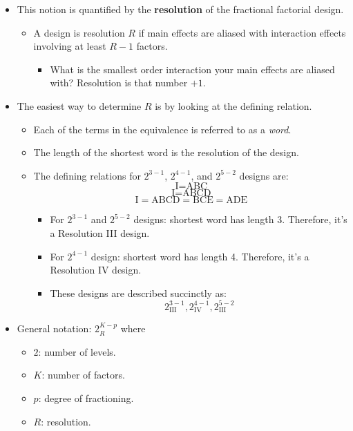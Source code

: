 \begin{itemize}
      \item This notion is quantified by the \textbf{resolution} of the fractional factorial design.
            \begin{itemize}[$\rightarrow$]
                  \item A design is resolution $R$ if main effects are aliased with interaction effects involving at least $R - 1$ factors.
                        \begin{itemize}[label={}]
                              \item What is the smallest order interaction your main effects are aliased with? Resolution is that number $ +1 $.
                        \end{itemize}
            \end{itemize}
      \item The easiest way to determine $R$ is by looking at the defining relation.
            \begin{itemize}
                  \item Each of the terms in the equivalence is referred to as a \emph{word}.
            \end{itemize}
            \begin{itemize}[$\rightarrow$]
                  \item The length of the shortest word is the resolution of the design.
            \end{itemize}
            \begin{itemize}[*]
                  \item The defining relations for $ 2^{3-1} $, $ 2^{4-1} $, and $ 2^{5-2} $ designs are:
                        \[ \text{I}=\text{ABC} \]
                        \[ \text{I}=\text{ABCD} \]
                        \[ \text{I}=\text{ABCD}=\text{BCE}=\text{ADE} \]
                        \begin{itemize}[label={}]
                              \item For $ 2^{3-1} $ and $ 2^{5-2} $ designs: shortest word has length 3. Therefore, it's a Resolution III design.
                              \item For $ 2^{4-1} $ design: shortest word has length 4. Therefore, it's a Resolution IV design.
                              \item These designs are described succinctly as:
                                    \[ 2^{3-1}_{\text{III}},2^{4-1}_{\text{IV}},2^{5-2}_{\text{III}} \]
                        \end{itemize}
            \end{itemize}
      \item General notation: $ 2_R^{K-p} $ where
            \begin{itemize}
                  \item $ 2 $: number of levels.
                  \item $ K $: number of factors.
                  \item $ p $: degree of fractioning.
                  \item $ R $: resolution.
            \end{itemize}
\end{itemize}
